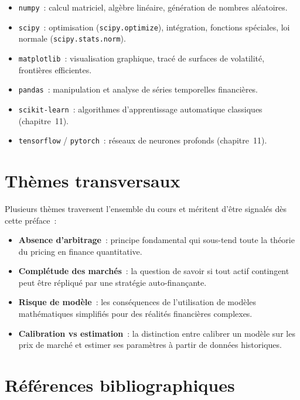 \begin{itemize}
    \item \texttt{numpy}~: calcul matriciel, alg\`ebre lin\'eaire, g\'en\'eration
          de nombres al\'eatoires.
    \item \texttt{scipy}~: optimisation (\texttt{scipy.optimize}), int\'egration,
          fonctions sp\'eciales, loi normale (\texttt{scipy.stats.norm}).
    \item \texttt{matplotlib}~: visualisation graphique, trac\'e de surfaces
          de volatilit\'e, fronti\`eres efficientes.
    \item \texttt{pandas}~: manipulation et analyse de s\'eries temporelles
          financi\`eres.
    \item \texttt{scikit-learn}~: algorithmes d'apprentissage automatique
          classiques (chapitre~11).
    \item \texttt{tensorflow} / \texttt{pytorch}~: r\'eseaux de neurones
          profonds (chapitre~11).
\end{itemize}

\section*{Th\`emes transversaux}

Plusieurs th\`emes traversent l'ensemble du cours et m\'eritent d'\^etre
signal\'es d\`es cette pr\'eface~:

\begin{itemize}
    \item \textbf{Absence d'arbitrage}~: principe fondamental qui sous-tend
          toute la th\'eorie du pricing en finance quantitative.
    \item \textbf{Compl\'etude des march\'es}~: la question de savoir si
          tout actif contingent peut \^etre r\'epliqu\'e par une strat\'egie
          auto-finan\c{c}ante.
    \item \textbf{Risque de mod\`ele}~: les cons\'equences de l'utilisation
          de mod\`eles math\'ematiques simplifi\'es pour des r\'ealit\'es
          financi\`eres complexes.
    \item \textbf{Calibration vs estimation}~: la distinction entre calibrer
          un mod\`ele sur les prix de march\'e et estimer ses param\`etres
          \`a partir de donn\'ees historiques.
\end{itemize}

\section*{R\'ef\'erences bibliographiques}

